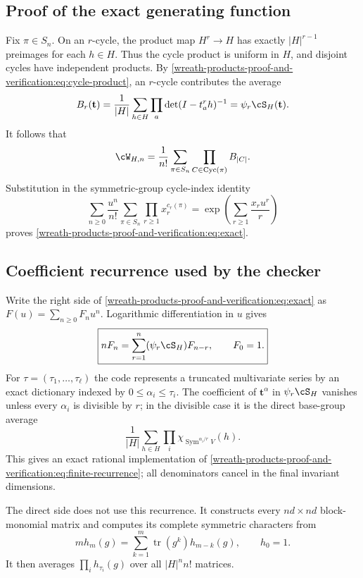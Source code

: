 \documentclass[10pt]{article}
\newcommand{\Sym}{\operatorname{Sym}}
\begin{document}
\subsection{Proof of the exact generating function}
Fix $\pi\in S_n$.  On an $r$-cycle, the product map $H^r\to H$ has exactly
$|H|^{r-1}$ preimages for each $h\in H$.  Thus the cycle product is uniform in
$H$, and disjoint cycles have independent products.  By
\eqref{wreath-products-proof-and-verification:eq:cycle-product}, an $r$-cycle contributes the average
\[
 B_r(\mathbf t)=\frac1{|H|}\sum_{h\in H}
 \prod_a\det(I-t_a^rh)^{-1}=\psi_r\cS_H(\mathbf t).
\]
It follows that
\[
 \cW_{H,n}=\frac1{n!}\sum_{\pi\in S_n}
 \prod_{C\in\operatorname{Cyc}(\pi)}B_{|C|}.
\]
Substitution in the symmetric-group cycle-index identity
\[
 \sum_{n\ge0}\frac{u^n}{n!}\sum_{\pi\in S_n}
 \prod_{r\ge1}x_r^{c_r(\pi)}
 =\exp\left(\sum_{r\ge1}\frac{x_ru^r}{r}\right)
\]
proves \eqref{wreath-products-proof-and-verification:eq:exact}.

\subsection{Coefficient recurrence used by the checker}
Write the right side of \eqref{wreath-products-proof-and-verification:eq:exact} as $F(u)=\sum_{n\ge0}F_nu^n$.
Logarithmic differentiation in $u$ gives
\begin{equation}\label{wreath-products-proof-and-verification:eq:finite-recurrence}
 \boxed{nF_n=\sum_{r=1}^n(\psi_r\cS_H)F_{n-r},\qquad F_0=1.}
\end{equation}
For $\tau=(\tau_1,\ldots,\tau_\ell)$ the code represents a truncated
multivariate series by an exact dictionary indexed by
$0\le\alpha_i\le\tau_i$.  The coefficient of $\mathbf t^\alpha$ in
$\psi_r\cS_H$ vanishes unless every $\alpha_i$ is divisible by $r$; in the
divisible case it is the direct base-group average
\[
 \frac1{|H|}\sum_{h\in H}\prod_i
 \chi_{\Sym^{\alpha_i/r}V}(h).
\]
This gives an exact rational implementation of \eqref{wreath-products-proof-and-verification:eq:finite-recurrence};
all denominators cancel in the final invariant dimensions.

The direct side does not use this recurrence.  It constructs every
$nd\times nd$ block-monomial matrix and computes its complete symmetric
characters from
\begin{equation}\label{wreath-products-proof-and-verification:eq:newton-h}
 m h_m(g)=\sum_{k=1}^m\operatorname{tr}(g^k)h_{m-k}(g),\qquad h_0=1.
\end{equation}
It then averages $\prod_i h_{\tau_i}(g)$ over all $|H|^nn!$ matrices.
\end{document}
